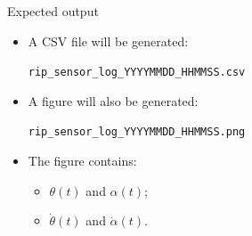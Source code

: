 \documentclass[aspectratio=169]{beamer}
\begin{document}
\begin{frame}{Expected output}

\begin{itemize}
    \item A CSV file will be generated:
    \vspace{0.15cm}

    \begin{center}
    \texttt{rip\_sensor\_log\_YYYYMMDD\_HHMMSS.csv}
    \end{center}

    \vspace{0.25cm}

    \item A figure will also be generated:
    \vspace{0.15cm}

    \begin{center}
    \texttt{rip\_sensor\_log\_YYYYMMDD\_HHMMSS.png}
    \end{center}

    \vspace{0.25cm}

    \item The figure contains:
    \vspace{0.15cm}
    \begin{itemize}
        \item $\theta(t)$ and $\alpha(t)$;
        \item $\dot\theta(t)$ and $\dot\alpha(t)$.
    \end{itemize}
\end{itemize}

\end{frame}
\end{document}
